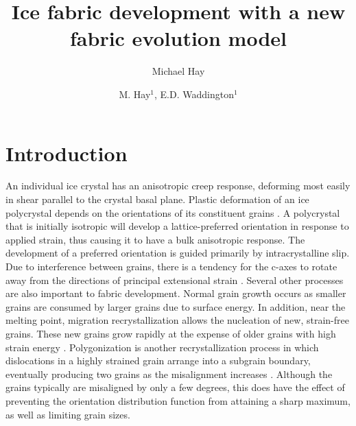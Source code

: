 \documentclass{igs}
\begin{document}
\title{Ice fabric development with a new fabric evolution model}

\author{Michael Hay}

\author[Hay and Waddington]{M. Hay$^1$, E.D. Waddington$^1$}





\maketitle 

\section{Introduction}
An individual ice crystal has an anisotropic creep response, deforming most easily in shear parallel to the crystal basal plane. Plastic deformation of an ice polycrystal depends on the orientations of its constituent grains \citep{azuma94}. A polycrystal that is initially isotropic will develop a lattice-preferred orientation in response to applied strain, thus causing it to have a bulk anisotropic response. The development of a preferred orientation is guided primarily by intracrystalline slip. Due to interference between grains, there is a tendency for the c-axes to rotate away from the directions of principal extensional strain \citep{azuma96}. Several other processes are also important to fabric development. Normal grain growth occurs as smaller grains are consumed by larger grains due to surface energy. In addition, near the melting point, migration recrystallization allows the nucleation of new, strain-free grains. These new grains grow rapidly at the expense of older grains with high strain energy \citep{duval1995}. Polygonization is another recrystallization process in which dislocations in a highly strained grain arrange into a subgrain boundary, eventually producing two grains as the misalignment increases \citep{alley97}. Although the grains typically are misaligned by only a few degrees, this does have the effect of preventing the orientation distribution function from attaining a sharp maximum, as well as limiting grain sizes.
\end{document}

